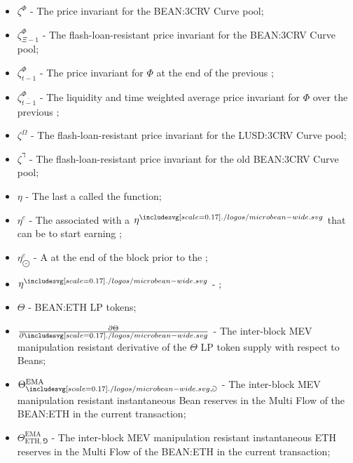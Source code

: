 \documentclass[class=article, crop=false]{standalone}
\begin{document}
\begin{itemize}[topsep=0pt, itemsep=3pt,leftmargin=16pt]



    \item[] $\zeta^{\Phi}$ - \hypertarget{ht95}{The price invariant for the BEAN:3CRV Curve pool};
    \item[] $\zeta^{\Phi}_{\Xi-1}$ - \hypertarget{ht96}{The flash-loan-resistant price invariant for the BEAN:3CRV Curve pool};
    \item[] $\zeta^{\Phi}_{t-1}$ - \hypertarget{ht97}{The price invariant for $\Phi$ at the end of the previous };
    \item[] $\zeta^{\Phi}_{\overline{t-1}}$ - \hypertarget{ht98}{The liquidity and time weighted average price invariant for $\Phi$ over the previous };
    \item[] $\zeta^{\Omega}$ - \hypertarget{ht99}{The flash-loan-resistant price invariant for the LUSD:3CRV Curve pool};
    \item[] $\zeta^{\daleth}$ - \hypertarget{ht94}{The flash-loan-resistant price invariant for the old BEAN:3CRV Curve pool};
    \item[] $\eta$ - \hypertarget{ht104}{The last  a  called the  function};
    \item[] $\eta^{c}$ - \hypertarget{ht106}{The   associated with a  $\eta^{\bean}$ that can be  to start earning };
    \item[] $\eta_{\bigodot}^c$ - \hypertarget{ht107}{A    at the end of the block prior to the };
    \item[] $\eta^{\bean}$ - \hypertarget{ht105}{ \Bean};
    \item[] $\Theta$ - BEAN:ETH  LP tokens;
    \item[] $\frac{\partial \Theta}{\partial \bean}$ - The inter-block MEV manipulation resistant derivative of the $\Theta$ LP token supply with respect to Beans;
    \item[] $\Theta^{\text{EMA}}_{\bean,\Game}$ - The inter-block MEV manipulation resistant instantaneous Bean reserves in the Multi Flow  of the BEAN:ETH  in the current transaction;
    \item[] $\Theta^{\text{EMA}}_{\text{ETH},\Game}$ - The inter-block MEV manipulation resistant instantaneous ETH reserves in the Multi Flow  of the BEAN:ETH  in the current transaction;

\end{itemize}
\end{document}
